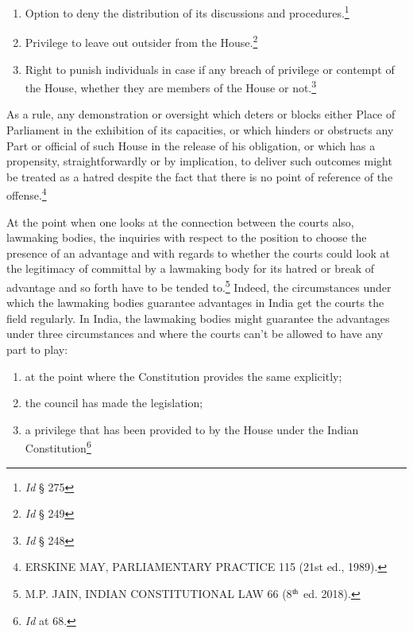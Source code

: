\begin{multicols}{2}
\begin{enumerate}[label=$\bullet$]
\item Option to deny the distribution of its discussions and procedures.\footnote{\textit{Id} § 275}

\item Privilege to leave out outsider from the House.\footnote{\textit{Id} § 249}

\item Right to punish individuals in case if any breach of privilege or contempt of the House, whether they are members of the House or not.\footnote{\textit{Id} § 248}
\end{enumerate}


\noi
As a rule, any demonstration or oversight which deters or blocks either Place of Parliament in
the exhibition of its capacities, or which hinders or obstructs any Part or official of such
House in the release of his obligation, or which has a propensity, straightforwardly or by
implication, to deliver such outcomes might be treated as a hatred despite the fact that there is
no point of reference of the offense.\footnote{ERSKINE MAY, PARLIAMENTARY PRACTICE 115 (21st ed., 1989).}

\noi
At the point when one looks at the connection between the courts also, lawmaking bodies, the
inquiries with respect to the position to choose the presence of an advantage and with regards
to whether the courts could look at the legitimacy of committal by a lawmaking body for its
hatred or break of advantage and so forth have to be tended to.\footnote{M.P. JAIN, INDIAN CONSTITUTIONAL LAW 66 (8$^{\rm th}$ ed. 2018).} Indeed, the circumstances under which the lawmaking bodies guarantee advantages in India get the courts the field regularly. In India, the lawmaking bodies might guarantee the advantages under three
circumstances and where the courts can’t be allowed to have any part to play:

\begin{enumerate}[label=$\bullet$]
\item at the point where the Constitution provides the same explicitly;

\item the council has made the legislation;

\item a privilege that has been provided to by the House under the Indian Constitution\footnote{\textit{Id} at 68.}
\end{enumerate}


\end{multicols}
